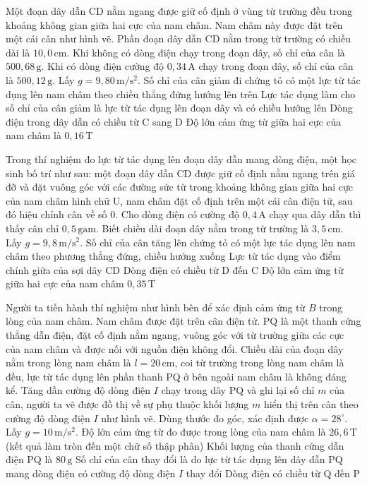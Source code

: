 \documentclass[12pt,a4paper]{article}
\begin{document}
\begin{ex}
	Một đoạn dây dẫn CD nằm ngang được giữ cố định ở vùng từ trường đều trong khoảng không gian giữa hai cực của nam châm. Nam châm này được đặt trên một cái cân như hình vẽ. Phần đoạn dây dẫn CD nằm trong từ trường có chiều dài là $10{,}0 \, \mathrm{cm}$. Khi không có dòng điện chạy trong đoạn dây, số chỉ của cân là $500{,}68 \, \mathrm{g}$. Khi có dòng điện cường độ $0{,}34 \, \mathrm{A}$ chạy trong đoạn dây, số chỉ của cân là $500{,}12 \, \mathrm{g}$. Lấy $g = 9{,}80 \, \mathrm{m/s^2}$.
	\choiceTF
	{Số chỉ của cân giảm đi chứng tỏ có một lực từ tác dụng lên nam châm theo chiều thẳng đứng hướng lên trên}
	{Lực tác dụng làm cho số chỉ của cân giảm là lực từ tác dụng lên đoạn dây và có chiều hướng lên}
	{Dòng điện trong dây dẫn có chiều từ C sang D}
	{Độ lớn cảm ứng từ giữa hai cực của nam châm là $0{,}16 \, \mathrm{T}$}
\end{ex}

\begin{ex}
	Trong thí nghiệm đo lực từ tác dụng lên đoạn dây dẫn mang dòng điện, một học sinh bố trí như sau: một đoạn dây dẫn CD được giữ cố định nằm ngang trên giá đỡ và đặt vuông góc với các đường sức từ trong khoảng không gian giữa hai cực của nam châm hình chữ U, nam châm đặt cố định trên một cái cân điện tử, sau đó hiệu chỉnh cân về số 0. Cho dòng điện có cường độ $0{,}4 \, \mathrm{A}$ chạy qua dây dẫn thì thấy cân chỉ $0{,}5 \, \mathrm{gam}$. Biết chiều dài đoạn dây nằm trong từ trường là $3{,}5 \, \mathrm{cm}$. Lấy $g = 9{,}8 \, \mathrm{m/s^2}$.
	\choiceTF
	{Số chỉ của cân tăng lên chứng tỏ có một lực tác dụng lên nam châm theo phương thẳng đứng, chiều hướng xuống}
	{Lực từ tác dụng vào điểm chính giữa của sợi dây CD}
	{Dòng điện có chiều từ D đến C}
	{Độ lớn cảm ứng từ giữa hai cực của nam châm $0{,}35 \, \mathrm{T}$}
\end{ex}

\begin{ex}
	Người ta tiến hành thí nghiệm như hình bên để xác định cảm ứng từ $B$ trong lòng của nam châm. Nam châm được đặt trên cân điện tử. PQ là một thanh cứng thẳng dẫn điện, đặt cố định nằm ngang, vuông góc với từ trường giữa các cực của nam châm và được nối với nguồn điện không đổi. Chiều dài của đoạn dây nằm trong lòng nam châm là $l = 20 \, \mathrm{cm}$, coi từ trường trong lòng nam châm là đều, lực từ tác dụng lên phần thanh PQ ở bên ngoài nam châm là không đáng kể. Tăng dần cường độ dòng điện $I$ chạy trong dây PQ và ghi lại số chỉ $m$ của cân, người ta vẽ được đồ thị về sự phụ thuộc khối lượng $m$ hiển thị trên cân theo cường độ dòng điện $I$ như hình vẽ. Dùng thước đo góc, xác định được $\alpha = 28^\circ$. Lấy $g = 10 \, \mathrm{m/s^2}$.
	\choiceTF
	{Độ lớn cảm ứng từ đo được trong lòng của nam châm là $26{,}6 \, \mathrm{T}$ (kết quả làm tròn đến một chữ số thập phân)}
	{Khối lượng của thanh cứng dẫn điện PQ là $80 \, \mathrm{g}$}
	{Số chỉ của cân thay đổi là do lực từ tác dụng lên dây dẫn PQ mang dòng điện có cường độ dòng điện $I$ thay đổi}
	{Dòng điện có chiều từ Q đến P}
\end{ex}
\end{document}
